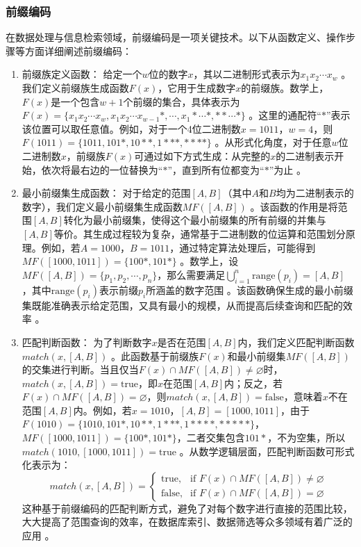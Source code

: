 \documentclass{cumcmthesis}
\numberwithin{equation}{section} %
\numberwithin{figure}{section} %
\numberwithin{table}{section} %
\begin{document}
\subsubsection{前缀编码}
在数据处理与信息检索领域，前缀编码是一项关键技术。以下从函数定义、操作步骤等方面详细阐述前缀编码：
\begin{enumerate}
    \item 前缀族定义函数：
给定一个\(w\)位的数字\(x\)，其以二进制形式表示为\(x_1x_2\cdots x_w\) 。我们定义前缀族生成函数\(F(x)\)，它用于生成数字\(x\)的前缀族。数学上，\(F(x)\)是一个包含\(w + 1\)个前缀的集合，具体表示为\(F(x)=\{x_1x_2\cdots x_w, x_1x_2\cdots x_{w - 1}*, \cdots, x_1* \cdots *, * * \cdots *\}\) 。这里的通配符“\(*\)”表示该位置可以取任意值。例如，对于一个4位二进制数\(x = 1011\)，\(w = 4\)，则\(F(1011)=\{1011, 101*, 10**, 1***, ****\}\) 。从形式化角度，对于任意\(w\)位二进制数\(x\)，前缀族\(F(x)\)可通过如下方式生成：从完整的\(x\)的二进制表示开始，依次将最右边的一位替换为“\(*\)”，直到所有位都变为“\(*\)”为止 。
    \item 最小前缀集生成函数：
对于给定的范围\([A, B]\)（其中\(A\)和\(B\)均为二进制表示的数字），我们定义最小前缀集生成函数\(MF([A, B])\) 。该函数的作用是将范围\([A, B]\)转化为最小前缀集，使得这个最小前缀集的所有前缀的并集与\([A, B]\)等价。其生成过程较为复杂，通常基于二进制数的位运算和范围划分原理。例如，若\(A = 1000\)，\(B = 1011\)，通过特定算法处理后，可能得到\(MF([1000, 1011]) = \{100*, 101*\}\) 。数学上，设\(MF([A, B])=\{p_1, p_2, \cdots, p_n\}\)，那么需要满足\(\bigcup_{i = 1}^{n} \text{range}(p_i)=[A, B]\) ，其中\(\text{range}(p_i)\)表示前缀\(p_i\)所涵盖的数字范围 。该函数确保生成的最小前缀集既能准确表示给定范围，又具有最小的规模，从而提高后续查询和匹配的效率 。
    \item 匹配判断函数：
为了判断数字\(x\)是否在范围\([A, B]\)内，我们定义匹配判断函数\(match(x, [A, B])\) 。此函数基于前缀族\(F(x)\)和最小前缀集\(MF([A, B])\)的交集进行判断。当且仅当\(F(x) \cap MF([A, B]) \neq \varnothing\)时，\(match(x, [A, B]) = \text{true}\)，即\(x\)在范围\([A, B]\)内；反之，若\(F(x) \cap MF([A, B]) = \varnothing\)，则\(match(x, [A, B]) = \text{false}\)，意味着\(x\)不在范围\([A, B]\)内。例如，若\(x = 1010\)，\([A, B] = [1000, 1011]\)，由于\(F(1010)=\{1010, 101*, 10**, 1***, 1****, *****\}\)，\(MF([1000, 1011]) = \{100*, 101*\}\)，二者交集包含\(101*\)，不为空集，所以\(match(1010, [1000, 1011]) = \text{true}\) 。从数学逻辑层面，匹配判断函数可形式化表示为：
\[match(x, [A, B]) = 
\begin{cases}
\text{true}, & \text{if } F(x) \cap MF([A, B]) \neq \varnothing \\
\text{false}, & \text{if } F(x) \cap MF([A, B]) = \varnothing
\end{cases}
\]
这种基于前缀编码的匹配判断方式，避免了对每个数字进行直接的范围比较，大大提高了范围查询的效率，在数据库索引、数据筛选等众多领域有着广泛的应用 。 
\end{enumerate} 
\end{document}
